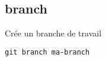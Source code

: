 \subsection*{branch}
Crée un branche de travail
\begin{verbatim}
git branch ma-branch
\end{verbatim}

